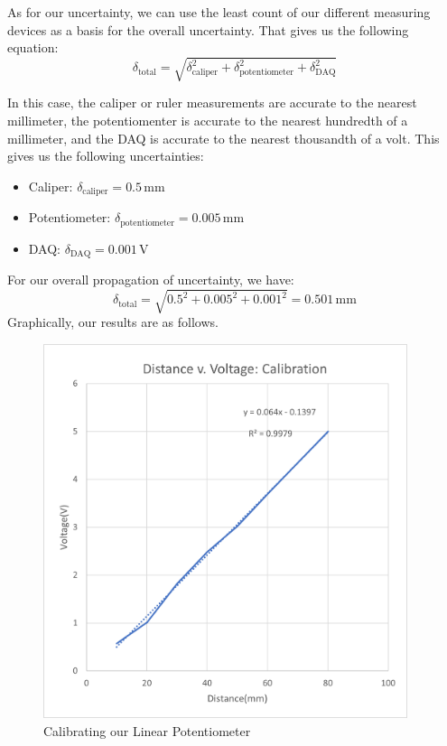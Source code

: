\documentclass{article}
\begin{document}
As for our uncertainty, we can use the least count of our different measuring devices as a basis for the overall uncertainty. That gives us the following equation:
\[
\delta_{\text{total}} = \sqrt{\delta_{\text{caliper}}^2 + \delta_{\text{potentiometer}}^2 + \delta_{\text{DAQ}}^2}
\]

In this case, the caliper or ruler measurements are accurate to the nearest millimeter, the potentiomenter is accurate to the nearest hundredth of a millimeter, and the DAQ is accurate to the nearest thousandth of a volt. This gives us the following uncertainties: 
\begin{itemize}
  \item Caliper: \(\delta_{\text{caliper}} = 0.5\, \text{mm}\)
  \item Potentiometer: \(\delta_{\text{potentiometer}} = 0.005\, \text{mm}\)
  \item DAQ: \(\delta_{\text{DAQ}} = 0.001\, \text{V}\)
\end{itemize}

For our overall propagation of uncertainty, we have:
\[
\delta_{\text{total}} = \sqrt{0.5^2 + 0.005^2 + 0.001^2} = 0.501\, \text{mm}
\]
Graphically, our results are as follows.


\begin{figure}[hbtp]
  \centering
  \includegraphics[width=0.95\textwidth]{lab3images/Calibration.png}
  \caption{Calibrating our Linear Potentiometer}
  \label{fig:Calibration}
\end{figure}
\end{document}
